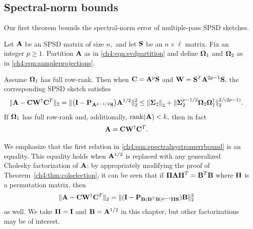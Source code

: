 \subsection{Spectral-norm bounds}
\label{ch4:sec:specnormbound}

Our first theorem bounds the spectral-norm error of multiple-pass SPSD sketches. 

\begin{thm}
Let $\mathbf{A}$ be an SPSD matrix of size $n,$ and let $\mathbf{S}$ be an $n \times
\ell$ matrix. Fix an integer $p \geq 1.$ Partition $\mathbf{A}$ as in \eqref{ch4:eqn:svdpartition} and
define $\mathbf{\Omega}_1$ and $\mathbf{\Omega}_2$ as in \eqref{ch4:eqn:sampleprojections}.

Assume $\mathbf{\Omega}_1$ has full row-rank. Then when $\mathbf{C} = \mathbf{A}^p \mathbf{S}$ and
$\mathbf{W} = \mathbf{S}^T \mathbf{A}^{2p-1} \mathbf{S},$ the corresponding SPSD sketch
satisfies
\begin{equation}
\|\mathbf{A} - \mathbf{C}\mathbf{W}^\dagger \mathbf{C}^T\|_2 = \|\big(\mathbf{I} -
\mathbf{P}_{\mathbf{A}^{p-1/2} \mathbf{S}}\big)\mathbf{A}^{1/2}\|_2^2 \leq
\left\|\mathbf{\Sigma}_2\right\|_2 + \|\mathbf{\Sigma}_2^{p-1/2} \mathbf{\Omega}_2
\mathbf{\Omega}_1^\dagger\|_2^{2/(2p-1)}.
  \label{ch4:eqn:spectralnystromerrbound}
\end{equation}
If $\mathbf{\Omega}_1$ has full row-rank and, additionally, $\mathrm{rank}(\mathbf{A}) < k,$ then in fact
\[
 \mathbf{A} = \mathbf{C}\mathbf{W}^\dagger \mathbf{C}^T.
\]
\label{ch4:thm:colselection}
\end{thm}

\begin{remark}
We emphasize that the first relation in \eqref{ch4:eqn:spectralnystromerrbound} is
an equality. This equality holds when $\mathbf{A}^{1/2}$ is replaced with any
generalized Cholesky factorization of $\mathbf{A}$: by appropriately modifying the
proof of Theorem~\ref{ch4:thm:colselection}, it can be seen that if $\boldsymbol{\Pi} \mathbf{A}
\boldsymbol{\Pi}^T = \mathbf{B}^T \mathbf{B}$ where $\mathbf{\Pi}$ is a permutation
matrix, then 
\[
 \|\mathbf{A} - \mathbf{C}\mathbf{W}^\dagger \mathbf{C}^T\|_2 = \|(\mathbf{I} -
\mathbf{P}_{\mathbf{B}(\mathbf{B}^T\mathbf{B})^{p-1}\boldsymbol{\Pi}\mathbf{S}})\mathbf{B}\|_2^2
\]
as well. We take $\boldsymbol{\Pi} = \mathbf{I}$ and $\mathbf{B} = \mathbf{A}^{1/2}$ in this
chapter, but other factorizations may be of interest.
\end{remark}

